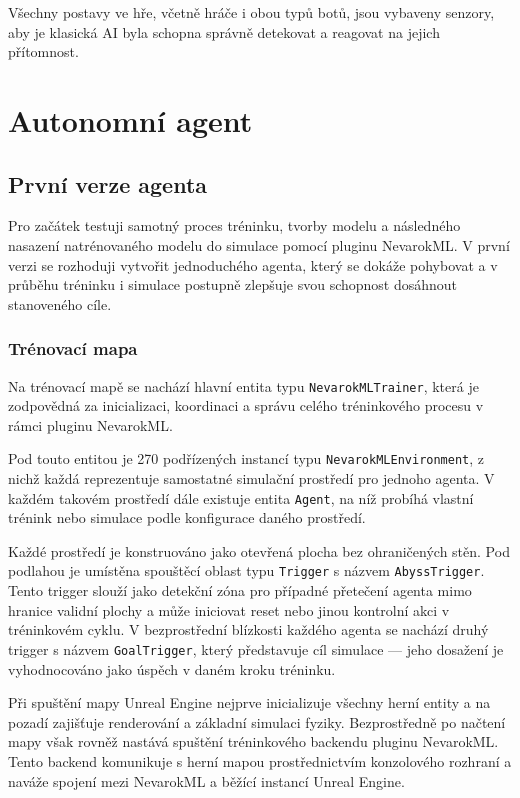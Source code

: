 Všechny postavy ve hře, včetně hráče i obou typů botů, jsou vybaveny senzory, aby je klasická AI byla schopna správně detekovat a reagovat na jejich přítomnost.

\newpage

\section{Autonomní agent}
\subsection{První verze agenta}
Pro začátek testuji samotný proces tréninku, tvorby modelu a následného nasazení natrénovaného modelu do simulace pomocí pluginu NevarokML. V první verzi se rozhoduji vytvořit jednoduchého agenta, který se dokáže pohybovat a v průběhu tréninku i simulace postupně zlepšuje svou schopnost dosáhnout stanoveného cíle.

\subsubsection{Trénovací mapa}

Na trénovací mapě se nachází hlavní entita typu \texttt{NevarokMLTrainer}, která je zodpovědná za inicializaci, koordinaci a správu celého tréninkového procesu v rámci pluginu NevarokML. 

Pod touto entitou je 270 podřízených instancí typu \texttt{NevarokMLEnvironment}, z nichž každá reprezentuje samostatné simulační prostředí pro jednoho agenta. V každém takovém prostředí dále existuje entita \texttt{Agent}, na níž probíhá vlastní trénink nebo simulace podle konfigurace daného prostředí.

Každé prostředí je konstruováno jako otevřená plocha bez ohraničených stěn. Pod podlahou je umístěna spouštěcí oblast typu \texttt{Trigger} s názvem \texttt{AbyssTrigger}. Tento trigger slouží jako detekční zóna pro případné přetečení agenta mimo hranice validní plochy a může iniciovat reset nebo jinou kontrolní akci v tréninkovém cyklu. V bezprostřední blízkosti každého agenta se nachází druhý trigger s názvem \texttt{GoalTrigger}, který představuje cíl simulace — jeho dosažení je vyhodnocováno jako úspěch v daném kroku tréninku.

Při spuštění mapy Unreal Engine nejprve inicializuje všechny herní entity a na pozadí zajišťuje renderování a základní simulaci fyziky. Bezprostředně po načtení mapy však rovněž nastává spuštění tréninkového backendu pluginu NevarokML. Tento backend komunikuje s herní mapou prostřednictvím konzolového rozhraní a naváže spojení mezi NevarokML a běžící instancí Unreal Engine. 

